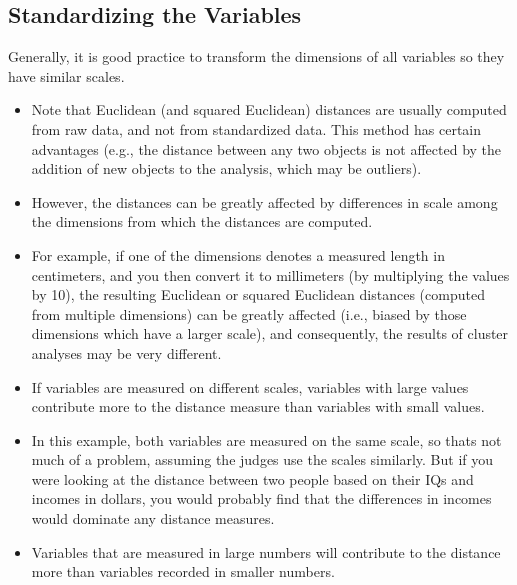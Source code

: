 \documentclass[a4paper,12pt]{report}
\begin{document}
\begin{itemize}
\section{Standardizing the Variables}
\begin{framed}
	{
		\large
		\noindent	Generally, it is good practice to transform the dimensions of all variables so they have similar scales.
	}
\end{framed}
\begin{itemize}
\item Note that Euclidean (and squared Euclidean) distances are usually computed from raw data, and not from standardized data. This method has certain advantages (e.g., the distance between any two objects is not affected by the addition of new objects to the analysis, which may be outliers). 
\item However, the distances can be greatly affected by differences in scale among the dimensions from which the distances are computed. 
\item 
For example, if one of the dimensions denotes a measured length in centimeters, and you then convert it to millimeters (by multiplying the values by 10), the resulting Euclidean or squared Euclidean distances (computed from multiple dimensions) can be greatly affected (i.e., biased by those dimensions which have a larger scale), and consequently, the results of cluster analyses may be very different. 
\end{itemize}




\begin{itemize}
	\item If variables are measured on different scales, variables with large values contribute
	more to the distance measure than variables with small values. 
	\item In this example, both
	variables are measured on the same scale, so thats not much of a problem, assuming
	the judges use the scales similarly. But if you were looking at the distance between two
	people based on their IQs and incomes in dollars, you would probably find that the
	differences in incomes would dominate any distance measures.
	
	
	\item Variables that are measured in large numbers will contribute to the distance more than variables recorded in smaller
	numbers.
	

\end{itemize}
\end{itemize}
\end{document}
